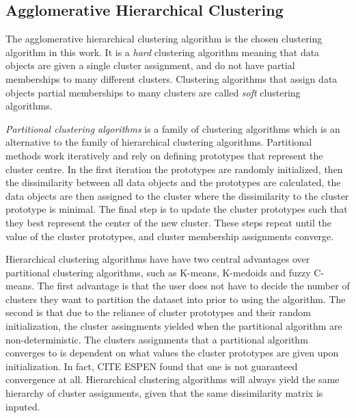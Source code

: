 \subsection{Agglomerative Hierarchical Clustering}

The agglomerative hierarchical clustering algorithm is the chosen clustering algorithm in this work. It is a \textit{hard} clustering algorithm meaning that data objects are given a single cluster assignment, and do not have partial memberships to many different clusters. Clustering algorithms that assign data objects partial memberships to many clusters are called \textit{soft} clustering algorithms. \bigskip

\textit{Partitional clustering algorithms} is a family of clustering algorithms which is an alternative to the family of hierarchical clustering algorithms. Partitional methods work iteratively and rely on defining prototypes that represent the cluster centre. In the first iteration the prototypes are randomly initialized, then the dissimilarity between all data objects and the prototypes are calculated, the data objects are then assigned to the cluster where the dissimilarity to the cluster prototype is minimal. The final step is to update the cluster prototypes such that they best represent the center of the new cluster. These steps repeat until the value of the cluster prototypes, and cluster membership assignments converge. \bigskip

Hierarchical clustering algorithms have have two central advantages over partitional clustering algorithms, such as K-means, K-medoids and fuzzy C-means. The first advantage is that the user does not have to decide the number of clusters they want to partition the dataset into prior to using the algorithm. The second is that due to the reliance of cluster prototypes and their random initialization, the cluster assingments yielded when the partitional algorithm are non-deterministic. The clusters assignments that a partitional algorithm converges to is dependent on what values the cluster prototypes are given upon initialization. In fact, CITE ESPEN found that one is not guaranteed convergence at all. Hierarchical clustering algorithms will always yield the same hierarchy of cluster assignments, given that the same dissimilarity matrix is inputed. \bigskip

